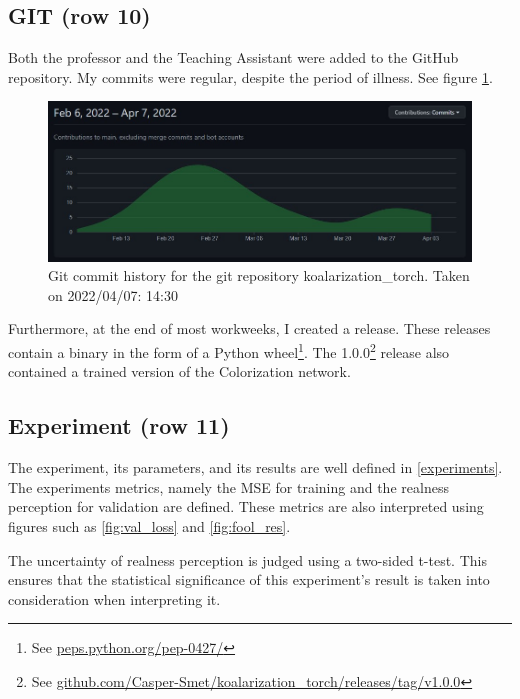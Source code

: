 \documentclass{article}
\begin{document}
    \subsection{GIT (row 10)}
        Both the professor and the Teaching Assistant were added to the GitHub repository. My commits were regular, despite the period of illness. See figure \ref{fig:com}.
        
        \begin{figure}[H]
            \centering
            \includegraphics[width=\textwidth]{img/commit-history.jpg}
            \caption{Git commit history for the git repository koalarization\_torch. Taken on 2022/04/07: 14:30}
            \label{fig:com}
        \end{figure}
        
        Furthermore, at the end of most workweeks, I created a release. These releases contain a binary in the form of a Python wheel\footnote{See \href{https://peps.python.org/pep-0427/}{peps.python.org/pep-0427/}}. The 1.0.0\footnote{See \href{https://github.com/Casper-Smet/koalarization\_torch/releases/tag/v1.0.0}{github.com/Casper-Smet/koalarization\_torch/releases/tag/v1.0.0}} release also contained a trained version of the Colorization network.
    
    \subsection{Experiment (row 11)}
        The experiment, its parameters, and its results are well defined in \ref{experiments}. The experiments metrics, namely the MSE for training and the realness perception for validation are defined. These metrics are also interpreted using figures such as \ref{fig:val_loss} and \ref{fig:fool_res}.
        
        The uncertainty of realness perception is judged using a two-sided t-test. This ensures that the statistical significance of this experiment's result is taken into consideration when interpreting it.
        
\end{document}
